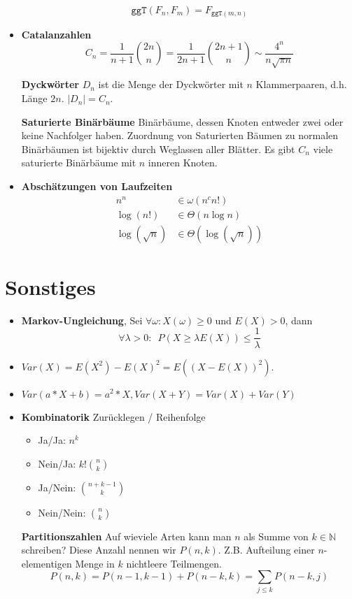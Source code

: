 \documentclass[landscape, 8pt, a4paper]{extarticle}
\newcommand{\ggT}{\texttt{ggT}}
\newcommand{\N}{\mathbb{N}}
\begin{document}
\begin{multicols}{3}
\begin{itemize}
		\begin{equation*}
			\ggT(F_n,F_m)=F_{\ggT(m,n)}
		\end{equation*}

		\item \textbf{Catalanzahlen}
		\begin{equation*}
			C_n=\frac{1}{n+1}\binom{2n}{n}=\frac{1}{2n+1}\binom{2n+1}{n}\sim\frac{4^n}{n\sqrt{\pi n}}
		\end{equation*}

		\textbf{Dyckwörter} $D_n$ ist die Menge der Dyckwörter mit $n$ Klammerpaaren, d.h. Länge $2n$. $|D_n|=C_n$.

		\textbf{Saturierte Binärbäume} Binärbäume, dessen Knoten entweder zwei oder keine Nachfolger haben. Zuordnung von Saturierten Bäumen zu normalen Binärbäumen ist bijektiv durch Weglassen aller Blätter. Es gibt $C_n$ viele saturierte Binärbäume mit $n$ inneren Knoten.

		\item \textbf{Abschätzungen von Laufzeiten}
		\begin{align*}
			n^n&\in \omega(n^c n!)\\
			\log(n!)&\in\Theta (n\log n)\\
			\log(\sqrt n)&\in \Theta(\log(\sqrt n))
		\end{align*}

	\end{itemize}

	\section{Sonstiges}
	\begin{itemize}
		\item \textbf{Markov-Ungleichung}, Sei $\forall \omega: X(\omega)\geq 0$ und $E(X)>0$, dann
		\begin{equation*}
			\forall \lambda >0: \enspace P(X\geq \lambda E(X))\leq \frac 1\lambda
		\end{equation*}

		\item $Var(X)=E(X^2)-E(X)^2=E((X-E(X))^2)$.
		\item $Var(a*X+b)=a^2*X, Var(X+Y)=Var(X)+Var(Y)$

		\item \textbf{Kombinatorik} Zurücklegen / Reihenfolge
		\begin{itemize}
			\item Ja/Ja: $n^k$
			\item Nein/Ja: $k!\binom nk$
			\item Ja/Nein: $\binom{n+k-1}{k}$
			\item Nein/Nein: $\binom nk$
		\end{itemize}

		\textbf{Partitionszahlen}
		Auf wieviele Arten kann man $n$ als Summe von $k\in \N$ schreiben? Diese Anzahl nennen wir $P(n,k)$. Z.B. Aufteilung einer $n$-elementigen Menge in $k$ nichtleere Teilmengen.
		\begin{equation*}
			P(n,k)=P(n-1,k-1)+P(n-k,k)=\sum_{j\leq k}P(n-k,j)
		\end{equation*}
	\end{itemize}
\end{multicols}
\end{document}

